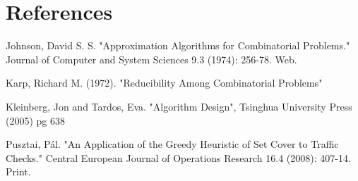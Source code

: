 \documentclass{report}
\begin{document}
\section{References}

Johnson, David S. S. "Approximation Algorithms for Combinatorial Problems." Journal of Computer and System Sciences 9.3 (1974): 256-78. Web.

Karp, Richard M. (1972). "Reducibility Among Combinatorial Problems"

Kleinberg, Jon and Tardos, Eva. "Algorithm Design", Tsinghua University Press (2005) pg 638

Pusztai, Pál. "An Application of the Greedy Heuristic of Set Cover to Traffic Checks." Central European Journal of Operations Research 16.4 (2008): 407-14. Print.
\end{document}
